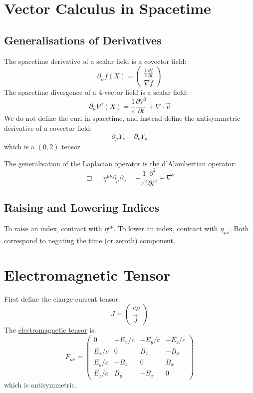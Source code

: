 \documentclass[../Main.tex]{subfiles}
\begin{document}
\section{Vector Calculus in Spacetime}
\subsection{Generalisations of Derivatives}
The spacetime derivative of a scalar field is a covector field:
\begin{equation*}
    \partial_\mu f(X) = \begin{pmatrix}\frac1c \frac{\partial f}{\partial t} \\ \nabla f\end{pmatrix}
\end{equation*}
The spacetime divergence of a 4-vector field is a scalar field:
\begin{equation*}
    \partial_\mu V^\mu(X) = \frac1c \frac{\partial V^0}{\partial t} + \nabla \cdot \vec{v}
\end{equation*}
We do not define the curl in spacetime, and instead define the antisymmetric derivative of a covector field:
\begin{equation*}
    \partial_\mu Y_\nu - \partial_\nu Y_\mu
\end{equation*}
which is a $(0, 2)$ tensor.

The generalisation of the Laplacian operator is the d'Alambertian operator:
\begin{equation*}
    \Box = \eta^{\mu\nu}\partial_\mu\partial_\nu = -\frac{1}{c^2} \frac{\partial^{2}}{\partial t^{2}} + \nabla^2
\end{equation*}
\subsection{Raising and Lowering Indices}
To raise an index, contract with $\eta^{\mu\nu}$. To lower an index, contract with $\eta_{\mu\nu}$. Both correspond to negating the time (or zeroth) component.
\section{Electromagnetic Tensor}
First define the charge-current tensor:
\begin{equation*}
    J = \begin{pmatrix}c\rho \\ \vec{J}\end{pmatrix}
\end{equation*}
The \underline{electromagnetic tensor} is:
\begin{equation*}
    F_{\mu \nu} =
    \begin{pmatrix}
        0 & -E_x / c & -E_y / c & -E_z / c \\
        E_x / c & 0 & B_z & -B_y \\
        E_y / c & -B_z & 0 & B_x \\
        E_z / c & B_y & -B_x & 0
    \end{pmatrix}
\end{equation*}
which is antisymmetric.
\end{document}
